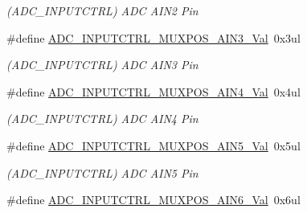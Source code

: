 \begin{DoxyCompactItemize}
\begin{DoxyCompactList}\small\item\em (A\+D\+C\+\_\+\+I\+N\+P\+U\+T\+C\+T\+R\+L) A\+D\+C A\+I\+N2 Pin \end{DoxyCompactList}\item 
\hypertarget{group___s_a_m_l21___a_d_c_ga251c9c1e052523310d09b1acc78e78ac}{}\#define \hyperlink{group___s_a_m_l21___a_d_c_ga251c9c1e052523310d09b1acc78e78ac}{A\+D\+C\+\_\+\+I\+N\+P\+U\+T\+C\+T\+R\+L\+\_\+\+M\+U\+X\+P\+O\+S\+\_\+\+A\+I\+N3\+\_\+\+Val}~0x3ul\label{group___s_a_m_l21___a_d_c_ga251c9c1e052523310d09b1acc78e78ac}

\begin{DoxyCompactList}\small\item\em (A\+D\+C\+\_\+\+I\+N\+P\+U\+T\+C\+T\+R\+L) A\+D\+C A\+I\+N3 Pin \end{DoxyCompactList}\item 
\hypertarget{group___s_a_m_l21___a_d_c_ga7f3a2f08ed3b07f84a8c33674b878797}{}\#define \hyperlink{group___s_a_m_l21___a_d_c_ga7f3a2f08ed3b07f84a8c33674b878797}{A\+D\+C\+\_\+\+I\+N\+P\+U\+T\+C\+T\+R\+L\+\_\+\+M\+U\+X\+P\+O\+S\+\_\+\+A\+I\+N4\+\_\+\+Val}~0x4ul\label{group___s_a_m_l21___a_d_c_ga7f3a2f08ed3b07f84a8c33674b878797}

\begin{DoxyCompactList}\small\item\em (A\+D\+C\+\_\+\+I\+N\+P\+U\+T\+C\+T\+R\+L) A\+D\+C A\+I\+N4 Pin \end{DoxyCompactList}\item 
\hypertarget{group___s_a_m_l21___a_d_c_ga5114a1b1855bcb59f3f85d84bc010f6a}{}\#define \hyperlink{group___s_a_m_l21___a_d_c_ga5114a1b1855bcb59f3f85d84bc010f6a}{A\+D\+C\+\_\+\+I\+N\+P\+U\+T\+C\+T\+R\+L\+\_\+\+M\+U\+X\+P\+O\+S\+\_\+\+A\+I\+N5\+\_\+\+Val}~0x5ul\label{group___s_a_m_l21___a_d_c_ga5114a1b1855bcb59f3f85d84bc010f6a}

\begin{DoxyCompactList}\small\item\em (A\+D\+C\+\_\+\+I\+N\+P\+U\+T\+C\+T\+R\+L) A\+D\+C A\+I\+N5 Pin \end{DoxyCompactList}\item 
\hypertarget{group___s_a_m_l21___a_d_c_ga1665dbaf7d7c4b25c646195814e52827}{}\#define \hyperlink{group___s_a_m_l21___a_d_c_ga1665dbaf7d7c4b25c646195814e52827}{A\+D\+C\+\_\+\+I\+N\+P\+U\+T\+C\+T\+R\+L\+\_\+\+M\+U\+X\+P\+O\+S\+\_\+\+A\+I\+N6\+\_\+\+Val}~0x6ul\label{group___s_a_m_l21___a_d_c_ga1665dbaf7d7c4b25c646195814e52827}


\end{DoxyCompactItemize}
